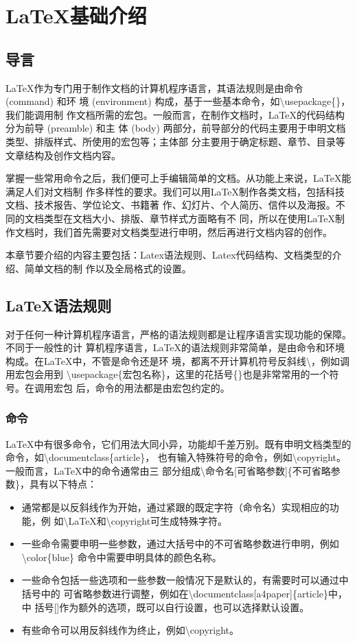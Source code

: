 \chapter{\LaTeX 基础介绍}
\section{导言}
LaTeX作为专门用于制作文档的计算机程序语言，其语法规则是由命令 (command) 和环
境 (environment) 构成，基于一些基本命令，如\textbackslash usepackage\{\}，我们能调用制
作文档所需的宏包。一般而言，在制作文档时，LaTeX的代码结构分为前导 (preamble) 和主
体 (body) 两部分，前导部分的代码主要用于申明文档类型、排版样式、所使用的宏包等；主体部
分主要用于确定标题、章节、目录等文章结构及创作文档内容。

掌握一些常用命令之后，我们便可上手编辑简单的文档。从功能上来说，LaTeX能满足人们对文档制
作多样性的要求。我们可以用LaTeX制作各类文档，包括科技文档、技术报告、学位论文、书籍著
作、幻灯片、个人简历、信件以及海报。不同的文档类型在文档大小、排版、章节样式方面略有不
同，所以在使用LaTeX制作文档时，我们首先需要对文档类型进行申明，然后再进行文档内容的创作。

本章节要介绍的内容主要包括：Latex语法规则、Latex代码结构、文档类型的介绍、简单文档的制
作以及全局格式的设置。

\section{\LaTeX 语法规则}
对于任何一种计算机程序语言，严格的语法规则都是让程序语言实现功能的保障。不同于一般性的计
算机程序语言，LaTeX的语法规则非常简单，是由命令和环境构成。在LaTeX中，不管是命令还是环
境，都离不开计算机符号反斜线\textbackslash，例如调用宏包会用到
\textbackslash usepackage\{宏包名称\}，这里的花括号\{\}也是非常常用的一个符号。在调用宏包
后，命令的用法都是由宏包约定的。

\subsection{命令}
LaTeX中有很多命令，它们用法大同小异，功能却千差万别。既有申明文档类型的命令，如\textbackslash documentclass\{article\}，
也有输入特殊符号的命令，例如\textbackslash copyright。一般而言，LaTeX中的命令通常由三
部分组成\textbackslash 命令名[可省略参数]\{不可省略参数\}，具有以下特点：
\begin{itemize}
    \item 通常都是以反斜线作为开始，通过紧跟的既定字符（命令名）实现相应的功能，例
          如\textbackslash LaTeX和\textbackslash copyright可生成特殊字符。
    \item 一些命令需要申明一些参数，通过大括号中的不可省略参数进行申明，例如\textbackslash color\{blue\}
          命令中需要申明具体的颜色名称。
    \item 一些命令包括一些选项和一些参数一般情况下是默认的，有需要时可以通过中括号中的
          可省略参数进行调整，例如在\textbackslash documentclass[a4paper]\{article\}中，中
          括号[]作为额外的选项，既可以自行设置，也可以选择默认设置。
    \item 有些命令可以用反斜线作为终止，例如\textbackslash copyright。
\end{itemize}

